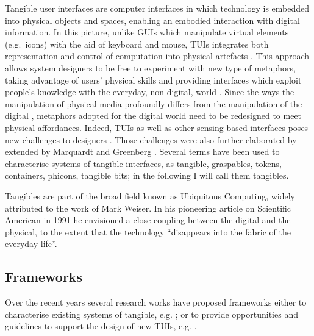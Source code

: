 Tangible user interfaces are computer interfaces in which technology is
embedded into physical objects and spaces, enabling an embodied
interaction with digital information. In this picture, unlike GUIs which
manipulate virtual elements (e.g.~icons) with the aid of keyboard and
mouse, TUIs integrates both representation and control of computation
into physical artefacts \autocite{krumm2009ubiquitous}. This approach
allows system designers to be free to experiment with new type of
metaphors, taking advantage of users' physical skills and providing
interfaces which exploit people's knowledge with the everyday,
non-digital, world \autocite{Jacob:2008vm}. Since the ways the
manipulation of physical media profoundly differs from the manipulation
of the digital \autocite{Terrenghi:2007uv}, metaphors adopted for the
digital world need to be redesigned to meet physical affordances.
Indeed, TUIs as well as other sensing-based interfaces poses new
challenges to designers \autocite{Bellotti:2002wg}. Those challenges
were also further elaborated by extended by Marquardt and Greenberg
\autocite*{Marquardt:2012tg}. Several terms have been used to
characterise systems of tangible interfaces, as tangible, graspables,
tokens, containers, phicons, tangible bits; in the following I will call
them tangibles.

Tangibles are part of the broad field known as Ubiquitous Computing,
widely attributed to the work of Mark Weiser. In his pioneering article
on Scientific American in 1991 \autocite{weiser1991computer} he
envisioned a close coupling between the digital and the physical, to the
extent that the technology ``disappears into the fabric of the everyday
life''.

\subsection{Frameworks}\label{frameworks}

Over the recent years several research works have proposed frameworks
either to characterise existing systems of tangible, e.g.
\autocites{Fishkin:2004uv}{Jacob:2008vm}{Hornecker:2006uq}; or to
provide opportunities and guidelines to support the design of new TUIs,
e.g. \autocites{Benford:2005bo}{Shaer:2004ta}{Rogers:2006te}.

